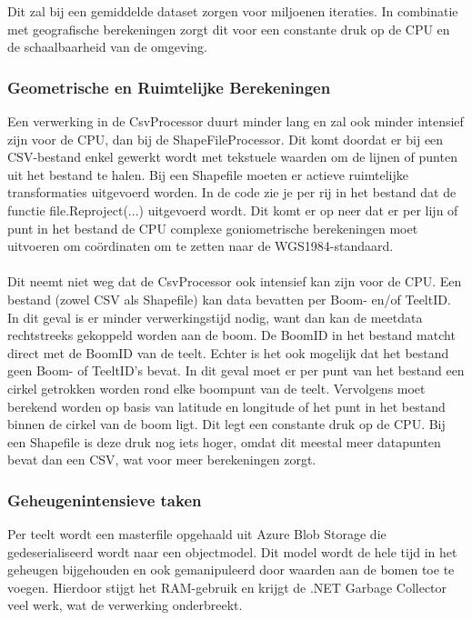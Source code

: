 Dit zal bij een gemiddelde dataset zorgen voor miljoenen iteraties. In combinatie met geografische berekeningen zorgt dit voor een constante druk op de CPU en de schaalbaarheid van de omgeving.

\subsubsection*{Geometrische en Ruimtelijke Berekeningen}

Een verwerking in de CsvProcessor duurt minder lang en zal ook minder intensief zijn voor de CPU, dan bij de ShapeFileProcessor. Dit komt doordat er bij een CSV-bestand enkel gewerkt wordt met tekstuele waarden om de lijnen of punten uit het bestand te halen. Bij een Shapefile moeten er actieve ruimtelijke transformaties uitgevoerd worden. In de code zie je per rij in het bestand dat de functie file.Reproject(...) uitgevoerd wordt. Dit komt er op neer dat er per lijn of punt in het bestand de CPU complexe goniometrische berekeningen moet uitvoeren om coördinaten om te zetten naar de WGS1984-standaard.
\\ 
\\
Dit neemt niet weg dat de CsvProcessor ook intensief kan zijn voor de CPU. Een bestand (zowel CSV als Shapefile) kan data bevatten per Boom- en/of TeeltID. In dit geval is er minder verwerkingstijd nodig, want dan kan de meetdata rechtstreeks gekoppeld worden aan de boom. De BoomID in het bestand matcht direct met de BoomID van de teelt. Echter is het ook mogelijk dat het bestand geen Boom- of TeeltID's bevat. In dit geval moet er per punt van het bestand een cirkel getrokken worden rond elke boompunt van de teelt. Vervolgens moet berekend worden op basis van latitude en longitude of het punt in het bestand binnen de cirkel van de boom ligt. Dit legt een constante druk op de CPU. Bij een Shapefile is deze druk nog iets hoger, omdat dit meestal meer datapunten bevat dan een CSV, wat voor meer berekeningen zorgt.

\subsubsection*{Geheugenintensieve taken}

Per teelt wordt een masterfile opgehaald uit Azure Blob Storage die gedeserialiseerd wordt naar een objectmodel. Dit model wordt de hele tijd in het geheugen bijgehouden en ook gemanipuleerd door waarden aan de bomen toe te voegen. Hierdoor stijgt het RAM-gebruik en krijgt de .NET Garbage Collector veel werk, wat de verwerking onderbreekt. 

